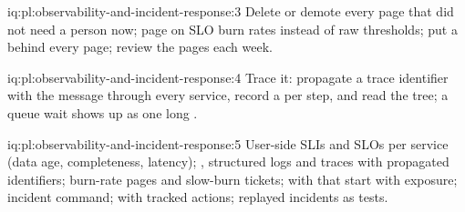 \begin{solution}{iq:pl:observability-and-incident-response:3}
Delete or demote every page that did not need a person now; page on SLO burn rates instead of raw thresholds; put a  behind every page;
review the pages each week.
\end{solution}

\begin{solution}{iq:pl:observability-and-incident-response:4}
Trace it: propagate a trace identifier with the message through every service, record a  per step, and read the tree; a queue wait
shows up as one long .
\end{solution}

\begin{solution}{iq:pl:observability-and-incident-response:5}
User-side SLIs and SLOs per service (data age, completeness, latency); , structured logs and traces with propagated identifiers;
burn-rate pages and slow-burn tickets;  with  that start with exposure; incident command;  with
tracked actions; replayed incidents as tests.
\end{solution}
